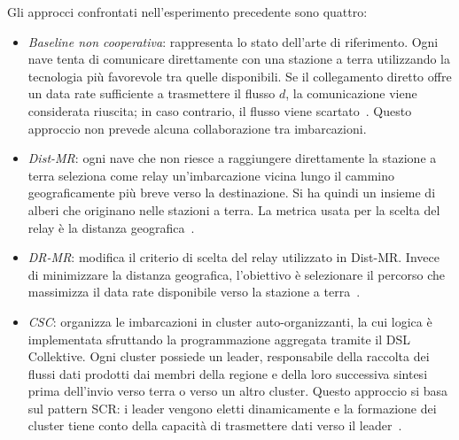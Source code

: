 Gli approcci confrontati nell'esperimento precedente sono quattro:
\begin{itemize}
    \item \emph{Baseline non cooperativa}: rappresenta lo stato dell'arte di riferimento. Ogni nave tenta di comunicare direttamente con una stazione a terra utilizzando la tecnologia più favorevole tra quelle disponibili. Se il collegamento diretto offre un data rate sufficiente a trasmettere il flusso $d$, la comunicazione viene considerata riuscita; in caso contrario, il flusso viene scartato~\cite{11217861}. Questo approccio non prevede alcuna collaborazione tra imbarcazioni.

    \item \emph{\ac{Dist-MR}}: ogni nave che non riesce a raggiungere direttamente la stazione a terra seleziona come relay un'imbarcazione vicina lungo il cammino geograficamente più breve verso la destinazione. Si ha quindi un insieme di alberi che originano nelle stazioni a terra. La metrica usata per la scelta del relay è la distanza geografica~\cite{11217861}.

    \item \emph{\ac{DR-MR}}: modifica il criterio di scelta del relay utilizzato in \ac{Dist-MR}. Invece di minimizzare la distanza geografica, l'obiettivo è selezionare il percorso che massimizza il data rate disponibile verso la stazione a terra~\cite{11217861}.

    \item \emph{\ac{CSC}}: organizza le imbarcazioni in cluster auto-organizzanti, la cui logica è implementata sfruttando la programmazione aggregata tramite il \ac{DSL} Collektive. Ogni cluster possiede un leader, responsabile della raccolta dei flussi dati prodotti dai membri della regione e della loro successiva sintesi prima dell'invio verso terra o verso un altro cluster. Questo approccio si basa sul pattern \ac{SCR}: i leader vengono eletti dinamicamente e la formazione dei cluster tiene conto della capacità di trasmettere dati verso il leader~\cite{11217861}.
\end{itemize}
